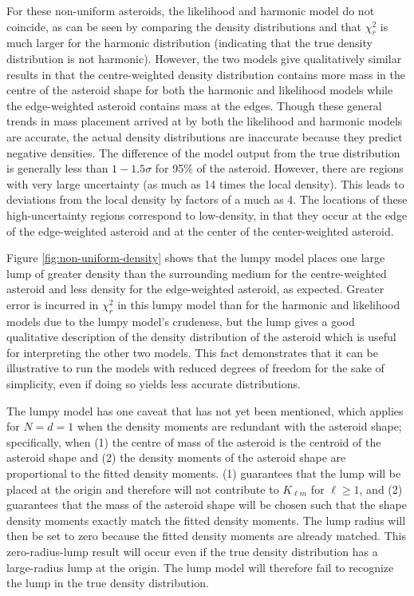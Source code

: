 \documentclass[fleqn,usenatbib]{mnras}
\begin{document}
For these non-uniform asteroids, the likelihood and harmonic model do not coincide, as can be seen by comparing the density distributions and that $\chi_r^2$ is much larger for the harmonic distribution (indicating that the true density distribution is not harmonic). However, the two models give qualitatively similar results in that the centre-weighted density distribution contains more mass in the centre of the asteroid shape for both the harmonic and likelihood models while the edge-weighted asteroid contains mass at the edges. Though these general trends in mass placement arrived at by both the likelihood and harmonic models are accurate, the actual density distributions are inaccurate because they predict negative densities. The difference of the model output from the true distribution is generally less than $1-1.5\sigma$ for 95\% of the asteroid. However, there are regions with very large uncertainty (as much as 14 times the local density). This leads to deviations from the local density by factors of a much as 4. The locations of these high-uncertainty regions correspond to low-density, in that they occur at the edge of the edge-weighted asteroid and at the center of the center-weighted asteroid.

Figure \ref{fig:non-uniform-density} shows that the lumpy model places one large lump of greater density than the surrounding medium for the centre-weighted asteroid and less density for the edge-weighted asteroid, as expected. Greater error is incurred in $\chi^2_r$ in this lumpy model than for the harmonic and likelihood models due to the lumpy model's crudeness, but the lump gives a good qualitative description of the density distribution of the asteroid which is useful for interpreting the other two models. This fact demonstrates that it can be illustrative to run the models with reduced degrees of freedom for the sake of simplicity, even if doing so yields less accurate distributions.



The lumpy model has one caveat that has not yet been mentioned, which applies for $N=d=1$ when the density moments are redundant with the asteroid shape; specifically, when (1) the centre of mass of the asteroid is the centroid of the asteroid shape and (2) the density moments of the asteroid shape are proportional to the fitted density moments. (1) guarantees that the lump will be placed at the origin and therefore will not contribute to $K_{\ell m}$ for $\ell \geq 1$, and (2) guarantees that the mass of the asteroid shape will be chosen such that the shape density moments exactly match the fitted density moments. The lump radius will then be set to zero because the fitted density moments are already matched. This zero-radius-lump result will occur even if the true density distribution has a large-radius lump at the origin. The lump model will therefore fail to recognize the lump in the true density distribution.
\end{document}
